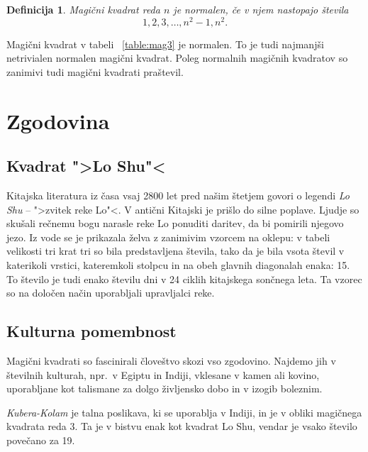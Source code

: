 \documentclass[a4paper,12pt]{article}
\newtheorem{definicija}{Definicija}
\begin{document}
\begin{definicija}
   Magični kvadrat reda \(n\) je \emph{normalen}, če v njem nastopajo števila
   \begin{equation}
      \label{eq:numbers}
      1, 2, 3, \ldots, n^2-1, n^2.
   \end{equation}
\end{definicija}

Magični kvadrat v tabeli ~\ref{table:mag3} je normalen.
To je tudi najmanjši netrivialen normalen magični kvadrat.
Poleg normalnih magičnih kvadratov so zanimivi tudi magični kvadrati praštevil. %


\section{Zgodovina}

\subsection{Kvadrat ">Lo Shu"<}

Kitajska literatura iz časa vsaj 2800 let pred našim štetjem govori o legendi
\emph{Lo Shu} -- ">zvitek reke Lo"<. V antični Kitajski je prišlo do
silne poplave. Ljudje so skušali rečnemu bogu narasle reke Lo ponuditi daritev,
da bi pomirili njegovo jezo. Iz vode se je prikazala želva z zanimivim vzorcem
na oklepu: v tabeli velikosti tri krat tri so bila predstavljena števila, tako
da je bila vsota števil v katerikoli vrstici, kateremkoli stolpcu in na obeh
glavnih diagonalah enaka: 15. To število je tudi enako številu dni v 24 ciklih
kitajskega sončnega leta. Ta vzorec so na določen način uporabljali upravljalci
reke.


\subsection{Kulturna pomembnost}

Magični kvadrati so fascinirali človeštvo skozi vso zgodovino. Najdemo jih
v številnih kulturah, npr.\ v Egiptu in Indiji, vklesane v kamen ali
kovino, uporabljane kot talismane za dolgo življensko dobo in v
izogib boleznim.

\emph{Kubera-Kolam} je talna poslikava, ki se uporablja v Indiji, in je v
obliki magičnega kvadrata reda 3. Ta je v bistvu enak kot kvadrat
Lo Shu, vendar je vsako število povečano za 19.
\end{document}
